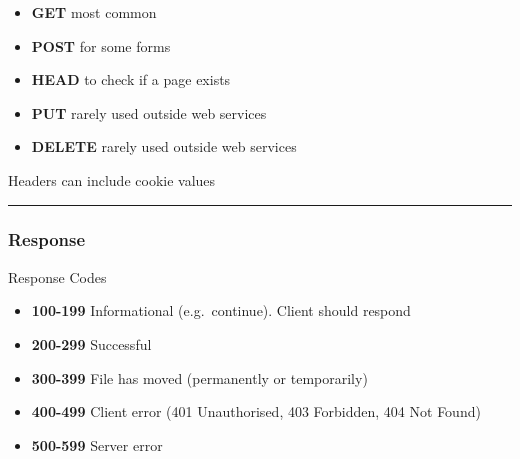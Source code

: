 \documentclass{article}[18pt]
\providecommand{\tightlist}{%
  \setlength{\itemsep}{0pt}\setlength{\parskip}{0pt}}
\begin{document}
\begin{itemize}
\tightlist
\item
  \textbf{GET} most common
\item
  \textbf{POST} for some forms
\item
  \textbf{HEAD} to check if a page exists
\item
  \textbf{PUT} rarely used outside web services
\item
  \textbf{DELETE} rarely used outside web services
\end{itemize}

Headers can include cookie values

\begin{center}\rule{0.5\linewidth}{\linethickness}\end{center}

\hypertarget{response}{%
\subsubsection{Response}\label{response}}

Response Codes

\begin{itemize}
\tightlist
\item
  \textbf{100-199} Informational (e.g.~continue). Client should respond
\item
  \textbf{200-299} Successful
\item
  \textbf{300-399} File has moved (permanently or temporarily)
\item
  \textbf{400-499} Client error (401 Unauthorised, 403 Forbidden, 404
  Not Found)
\item
  \textbf{500-599} Server error
\end{itemize}
\end{document}
